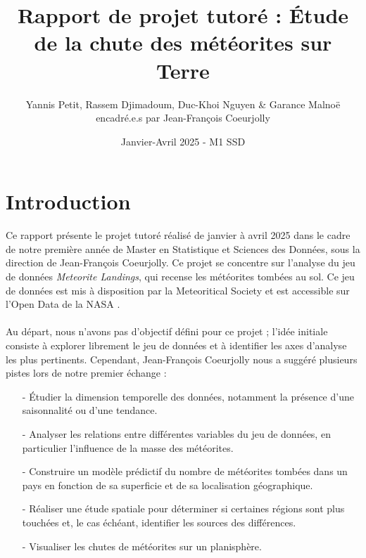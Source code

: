 \documentclass[12pt]{article}
\begin{document}
\title{Rapport de projet tutoré : Étude de la chute des météorites sur Terre}
\author{Yannis Petit, Rassem Djimadoum, Duc-Khoi Nguyen \& Garance Malnoë \\ encadré.e.s par Jean-François Coeurjolly}
\date{Janvier-Avril 2025 - M1 SSD}

\maketitle
\tableofcontents
\clearpage
{}
\section{Introduction}
Ce rapport présente le projet tutoré réalisé de janvier à avril 2025 dans le cadre de notre première année de Master en Statistique et Sciences des Données, sous la direction de Jean-François Coeurjolly. Ce projet se concentre sur l'analyse du jeu de données \textit{Meteorite Landings}, qui recense les météorites tombées au sol. Ce jeu de données est mis à disposition par la Meteoritical Society et est accessible sur l'Open Data de la NASA \cite{OpenData_NASA}.\\
\\
Au départ, nous n'avons pas d'objectif défini pour ce projet ; l'idée initiale consiste à explorer librement le jeu de données et à identifier les axes d'analyse les plus pertinents. Cependant, Jean-François Coeurjolly nous a suggéré plusieurs pistes lors de notre premier échange :\\
\begin{itemize}
	\item[-] Étudier la dimension temporelle des données, notamment la présence d'une saisonnalité ou d'une tendance.\\
	\item[-] Analyser les relations entre différentes variables du jeu de données, en particulier l'influence de la masse des météorites.\\
	\item[-] Construire un modèle prédictif du nombre de météorites tombées dans un pays en fonction de sa superficie et de sa localisation géographique.\\
	\item[-] Réaliser une étude spatiale pour déterminer si certaines régions sont plus touchées et, le cas échéant, identifier les sources des différences.\\
	\item[-] Visualiser les chutes de météorites sur un planisphère.\\
\end{itemize}
\end{document}
